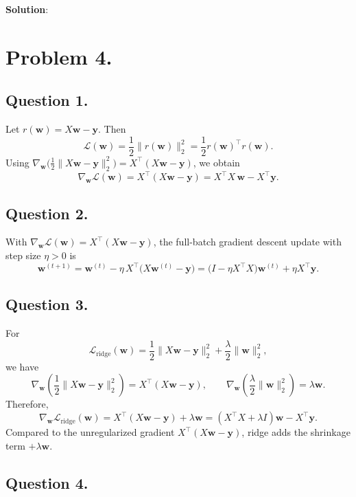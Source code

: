 \documentclass[submit]{../harvardml}
\newenvironment{solution}{
    \vspace{2mm}
    \color{blue}\noindent\textbf{Solution}:
}{}
\begin{document}
\begin{solution}

\section{Problem 4.}

\subsection{Question 1.}

Let \(r(\mathbf{w}) = X\mathbf{w}-\mathbf{y}\). Then
\[
\mathcal{L}(\mathbf{w})=\frac12\|r(\mathbf{w})\|_2^2=\frac12 r(\mathbf{w})^\top r(\mathbf{w}).
\]
Using \(\nabla_{\mathbf{w}}\big(\tfrac12\|X\mathbf{w}-\mathbf{y}\|_2^2\big)=X^\top(X\mathbf{w}-\mathbf{y})\), we obtain
\[
\nabla_{\mathbf{w}}\mathcal{L}(\mathbf{w}) = X^\top(X\mathbf{w}-\mathbf{y}) = X^\top X\,\mathbf{w} - X^\top \mathbf{y}.
\]
\subsection{Question 2.}

With \(\nabla_{\mathbf{w}}\mathcal{L}(\mathbf{w}) = X^\top(X\mathbf{w}-\mathbf{y})\), the full-batch gradient descent update with step size \(\eta>0\) is
\[
\mathbf{w}^{(t+1)}=\mathbf{w}^{(t)}-\eta\,X^\top\!\big(X\mathbf{w}^{(t)}-\mathbf{y}\big)
=\big(I-\eta X^\top X\big)\mathbf{w}^{(t)}+\eta X^\top \mathbf{y}.
\]

\subsection{Question 3.}

For
\[
\mathcal{L}_{\text{ridge}}(\mathbf{w})=\frac12\|X\mathbf{w}-\mathbf{y}\|_2^2+\frac{\lambda}{2}\|\mathbf{w}\|_2^2,
\]
we have
\[
\nabla_{\mathbf{w}}\left(\frac12\|X\mathbf{w}-\mathbf{y}\|_2^2\right)=X^\top(X\mathbf{w}-\mathbf{y}),
\qquad
\nabla_{\mathbf{w}}\left(\frac{\lambda}{2}\|\mathbf{w}\|_2^2\right)=\lambda \mathbf{w}.
\]
Therefore,
\[
\nabla_{\mathbf{w}}\mathcal{L}_{\text{ridge}}(\mathbf{w})
= X^\top(X\mathbf{w}-\mathbf{y})+\lambda \mathbf{w}
= (X^\top X+\lambda I)\mathbf{w}-X^\top\mathbf{y}.
\]
Compared to the unregularized gradient \(X^\top(X\mathbf{w}-\mathbf{y})\), ridge adds the shrinkage term \(+\lambda \mathbf{w}\).

\subsection{Question 4.}


\end{solution}
\end{document}
